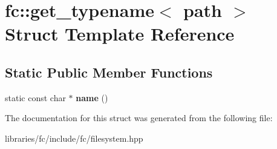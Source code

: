 \hypertarget{structfc_1_1get__typename_3_01path_01_4}{}\section{fc\+:\+:get\+\_\+typename$<$ path $>$ Struct Template Reference}
\label{structfc_1_1get__typename_3_01path_01_4}
\subsection*{Static Public Member Functions}
\begin{DoxyCompactItemize}
\item 
\mbox{\label{structfc_1_1get__typename_3_01path_01_4_a4940e9018467551f8015738a747d6947}} 
static const char $\ast$ {\bfseries name} ()
\end{DoxyCompactItemize}


The documentation for this struct was generated from the following file\+:\begin{DoxyCompactItemize}
\item 
libraries/fc/include/fc/filesystem.\+hpp\end{DoxyCompactItemize}
